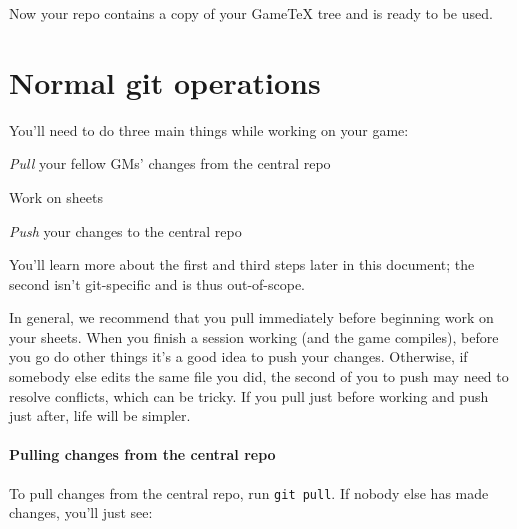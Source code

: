 \documentclass[green]{testgame}
\begin{document}

Now your repo contains a copy of your GameTeX tree and is ready to be
used.

\section{Normal git operations}

You'll need to do three main things while working on your game:
\begin{enum}[]
\item \emph{Pull} your fellow GMs' changes from the central repo
\item Work on sheets
\item \emph{Push} your changes to the central repo
\end{enum}

You'll learn more about the first and third steps later in this document; the second isn't git-specific and is thus out-of-scope.

In general, we recommend that you pull immediately before beginning work on your sheets. When you finish a session working (and the game compiles), before you go do other things it's a good idea to push your changes. Otherwise, if somebody else edits the same file you did, the second of you to push may need to resolve conflicts, which can be tricky. If you pull just before working and push just after, life will be simpler.

\paragraph*{Pulling changes from the central repo}

To pull changes from the central repo, run \texttt{git pull}. If nobody else has made changes, you'll just see:\\
\end{document}
